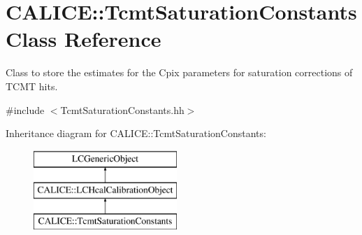 \section{C\-A\-L\-I\-C\-E\-:\-:Tcmt\-Saturation\-Constants Class Reference}
\label{classCALICE_1_1TcmtSaturationConstants}


Class to store the estimates for the Cpix parameters for saturation corrections of T\-C\-M\-T hits.  




{\ttfamily \#include $<$Tcmt\-Saturation\-Constants.\-hh$>$}

Inheritance diagram for C\-A\-L\-I\-C\-E\-:\-:Tcmt\-Saturation\-Constants\-:\begin{figure}[H]
\begin{center}
\leavevmode
\includegraphics[height=3.000000cm]{classCALICE_1_1TcmtSaturationConstants}
\end{center}
\end{figure}
